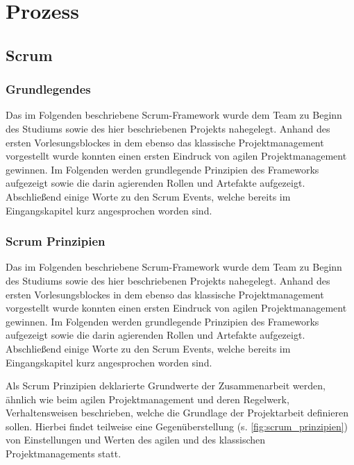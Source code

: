 \chapter{Prozess}
\label{ch:process}

\section{Scrum}
\label{sec:scrum}

\subsection{Grundlegendes}

Das im Folgenden beschriebene Scrum-Framework wurde dem Team zu Beginn des Studiums sowie des hier beschriebenen Projekts nahegelegt. Anhand des ersten Vorlesungsblockes in dem ebenso das klassische Projektmanagement vorgestellt wurde konnten einen ersten Eindruck von agilen Projektmanagement gewinnen. Im Folgenden werden grundlegende Prinzipien des Frameworks aufgezeigt sowie die darin agierenden Rollen und Artefakte aufgezeigt. Abschließend einige Worte zu den Scrum Events, welche bereits im Eingangskapitel kurz angesprochen worden sind.

\subsection{Scrum Prinzipien}

Das im Folgenden beschriebene Scrum-Framework wurde dem Team zu Beginn des Studiums sowie des hier beschriebenen Projekts nahegelegt. Anhand des ersten Vorlesungsblockes in dem ebenso das klassische Projektmanagement vorgestellt wurde konnten einen ersten Eindruck von agilen Projektmanagement gewinnen. Im Folgenden werden grundlegende Prinzipien des Frameworks aufgezeigt sowie die darin agierenden Rollen und Artefakte aufgezeigt. Abschließend einige Worte zu den Scrum Events, welche bereits im Eingangskapitel kurz angesprochen worden sind.

Als Scrum Prinzipien deklarierte Grundwerte der Zusammenarbeit werden, ähnlich wie beim agilen Projektmanagement und deren Regelwerk, Verhaltensweisen beschrieben, welche die Grundlage der Projektarbeit definieren sollen.
Hierbei findet teilweise eine Gegenüberstellung (s. \autoref{fig:scrum_prinzipien}) von Einstellungen und Werten des agilen und des klassischen Projektmanagements statt. 
 
